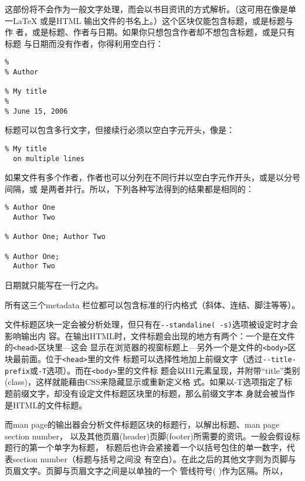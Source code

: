 \documentclass[fancyhdr,bookmark]{ctexbook}
\newcommand{\passthrough}[1]{#1}
\begin{document}
这部份将不会作为一般文字处理，而会以书目资讯的方式解析。（这可用在像是单
一LaTeX 或是HTML 输出文件的书名上。）这个区块仅能包含标题，或是标题与作
者，或是标题、作者与日期。如果你只想包含作者却不想包含标题，或是只有标题
与日期而没有作者，你得利用空白行：

\begin{lstlisting}
%
% Author

% My title
%
% June 15, 2006
\end{lstlisting}

标题可以包含多行文字，但接续行必须以空白字元开头，像是：

\begin{lstlisting}
% My title
  on multiple lines
\end{lstlisting}

如果文件有多个作者，作者也可以分列在不同行并以空白字元作开头，或是以分号间隔，或
是两者并行。所以，下列各种写法得到的结果都是相同的：

\begin{lstlisting}
% Author One
  Author Two

% Author One; Author Two

% Author One;
  Author Two
\end{lstlisting}

日期就只能写在一行之内。

所有这三个metadata
栏位都可以包含标准的行内格式（斜体、连结、脚注等等）。

文件标题区块一定会被分析处理，但只有在\passthrough{\lstinline!--standaline( -s)!}选项被设定时才会影响输出内
容。在输出HTML时，文件标题会出现的地方有两个：一个是在文件的\passthrough{\lstinline!<head>!}区块里---这会
显示在浏览器的视窗标题上---另外一个是文件的\passthrough{\lstinline!<body>!}区块最前面。位于\passthrough{\lstinline!<head>!}里的文件
标题可以选择性地加上前缀文字（透过\passthrough{\lstinline!--title-prefix!}或\passthrough{\lstinline!-T!}选项）。而在\passthrough{\lstinline!<body>!}里的文件标
题会以H1元素呈现，并附带``title''类别(class)，这样就能藉由CSS来隐藏显示或重新定义格
式。如果以-T选项指定了标题前缀文字，却没有设定文件标题区块里的标题，那么前缀文字本
身就会被当作是HTML的文件标题。

而man page的输出器会分析文件标题区块的标题行，以解出标题、man page
section number，
以及其他页眉(header)页脚(footer)所需要的资讯。一般会假设标题行的第一个单字为标题，
标题后也许会紧接着一个以括号包住的单一数字，代表section
number（标题与括号之间没
有空白）。在此之后的其他文字则为页脚与页眉文字。页脚与页眉文字之间是以单独的一个
管线符号( \textbar)作为区隔。所以，
\end{document}
